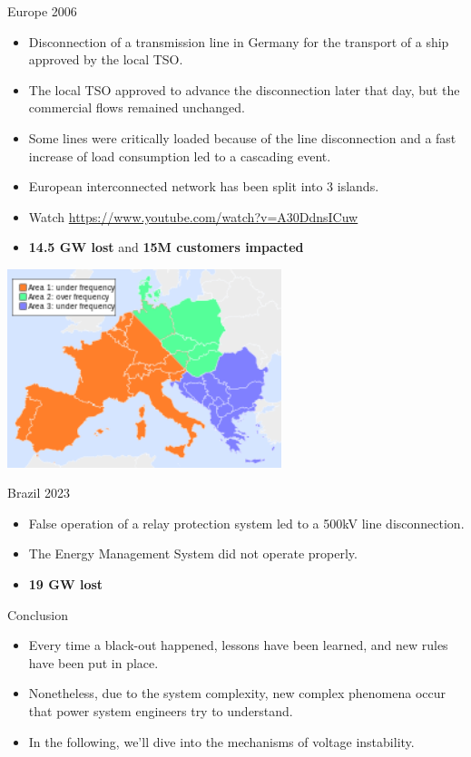 \begin{frame}[allowframebreaks]{Europe 2006}
\begin{itemize}
    \item Disconnection of a transmission line in Germany for the transport of a ship approved by the local TSO.
    \item The local TSO approved to advance the disconnection later that day, but the commercial flows remained unchanged.
    \item Some lines were critically loaded because of the line disconnection and a fast increase of load consumption led to a cascading event.
    \item European interconnected network has been split into 3 islands.
    \item Watch \url{https://www.youtube.com/watch?v=A30DdnsICuw}
    \item \textbf{14.5 GW lost} and \textbf{15M customers impacted} \cite{li2007analysis}
\end{itemize}

\begin{center}
\includegraphics[width=0.6\textwidth]{images/EuropeBlackOut.png}
\end{center}
\end{frame}

\begin{frame}{Brazil 2023}
\begin{itemize}
    \item False operation of a relay protection system led to a 500kV line disconnection.
    \item The Energy Management System did not operate properly.
    \item \textbf{19 GW lost}
\end{itemize}
\end{frame}
\begin{frame}{Conclusion}
\begin{itemize}
    \item Every time a black-out happened, lessons have been learned, and new rules have been put in place.
    \item Nonetheless, due to the system complexity, new complex phenomena occur that power system engineers try to understand.
    \item In the following, we'll dive into the mechanisms of voltage instability.
\end{itemize}
\end{frame}


